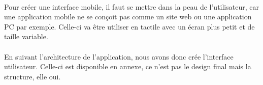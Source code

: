\paragraph{}Pour créer une interface mobile, il faut se mettre dans la peau de l'utilisateur, car une application mobile ne se conçoit pas comme un site web ou une application PC par exemple. Celle-ci va être utiliser en tactile avec un écran plus petit et de taille variable.

\paragraph{}En suivant l'architecture de l'application, nous avons donc crée l'interface utilisateur. Celle-ci est disponible en annexe, ce n'est pas le design final mais la structure, elle oui.